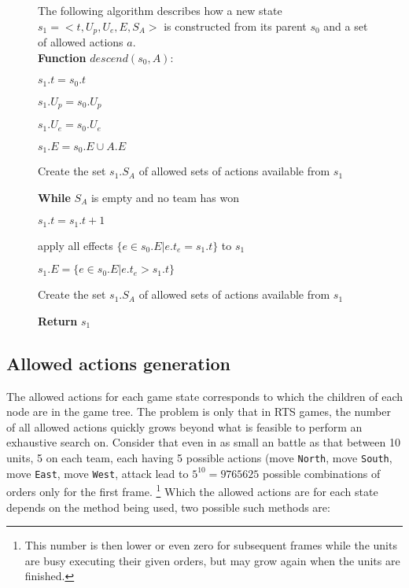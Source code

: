 \begin{figure}[h!t]
\begin{algorithm}
The following algorithm describes how a new state $s_1=<t,U_p,U_e,E,S_A>$ is constructed from its parent $s_0$ and a set of allowed actions $a$. \ \\

\textbf{Function} $descend(s_0,A)$:
\begin{enum}
\item $s_1.t = s_0.t$
\item $s_1.U_p = s_0.U_p$
\item $s_1.U_e = s_0.U_e$
\item $s_1.E = s_0.E \cup A.E$
\item Create the set $s_1.S_A$ of allowed sets of actions available from $s_1$

\item \textbf{While} $S_A$ is empty and no team has won
\begin{enum}
	\item $s_1.t = s_1.t + 1$
	\item apply all effects $\{e \in s_0.E | e.t_e = s_1.t\}$ to $s_1$
	\item $s_1.E = \{e \in s_0.E | e.t_e > s_1.t\}$
	\item Create the set $s_1.S_A$ of allowed sets of actions available from $s_1$
\end{enum}

\item \textbf{Return} $s_1$

\end{enum}
\label{algGeneration}
\end{algorithm}
\end{figure}



\subsection{Allowed actions generation}
The allowed actions for each game state corresponds to which the children of each node are in the game tree.
The problem is only that in RTS games, the number of all allowed actions quickly grows beyond what is feasible to perform an exhaustive search on.
Consider that even in as small an battle as that between 10 units, 5 on each team, each having 5 possible actions
(move \texttt{North}, move \texttt{South}, move \texttt{East}, move \texttt{West}, attack
lead to $5^10 = 9765625$ possible combinations of orders only for the first frame.
\footnote{This number is then lower or even zero for subsequent frames while the units are busy executing their given orders, but may grow again when the units are finished.}
Which the allowed actions are for each state depends on the method being used, two possible such methods are:

